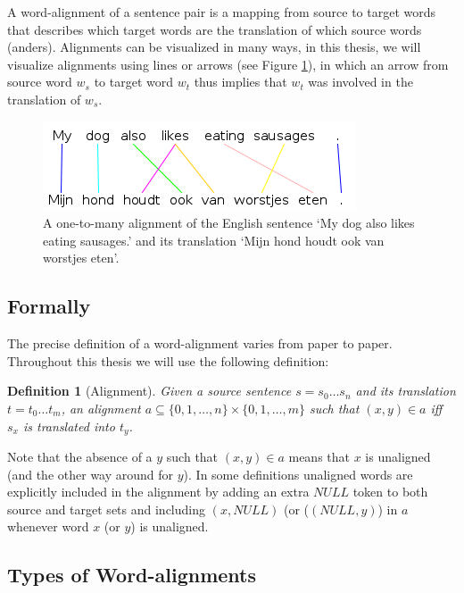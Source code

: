 \documentclass{report}
\theoremstyle{definition}
\theoremstyle{plain}
\newtheorem{definition}{Definition}
\begin{document}
A word-alignment of a sentence pair is a mapping from source to target words that describes which target words are the translation of which source words (anders). Alignments can be visualized in many ways, in this thesis, we will visualize alignments using lines or arrows (see Figure \ref{fig:alignment}), in which an arrow from source word $w_s$ to target word $w_t$ thus implies that $w_t$ was involved in the translation of $w_s$.


\begin{figure}[!ht]
\centering
\includegraphics[scale=0.6]{alignment.png}
\caption{A one-to-many alignment of the English sentence `My dog also likes eating sausages.' and its translation `Mijn hond houdt ook van worstjes eten'.%
\cite{maillette2010visualizing}
}\label{fig:alignment}
\end{figure}


\subsection{Formally}

The precise definition of a word-alignment varies from paper to paper. Throughout this thesis we will use the following definition:

\begin{definition}[Alignment]
Given a source sentence $s = s_0 \ldots s_n$ and its translation $t = t_0 \ldots t_m$, an alignment $a \subseteq \{0,1,\ldots,n\} \times \{0,1,\ldots,m\}$ such that $(x,y)\in a$ iff $s_x$ is translated into $t_y$.
\end{definition}

Note that the absence of a $y$ such that $(x,y)\in a$ means that $x$ is unaligned (and the other way around for $y$). In some definitions unaligned words are explicitly included in the alignment by adding an extra $NULL$ token to both source and target sets and including $(x,NULL)$ (or ($(NULL,y)$) in $a$ whenever word $x$ (or $y$) is unaligned.


\subsection{Types of Word-alignments}
\end{document}
